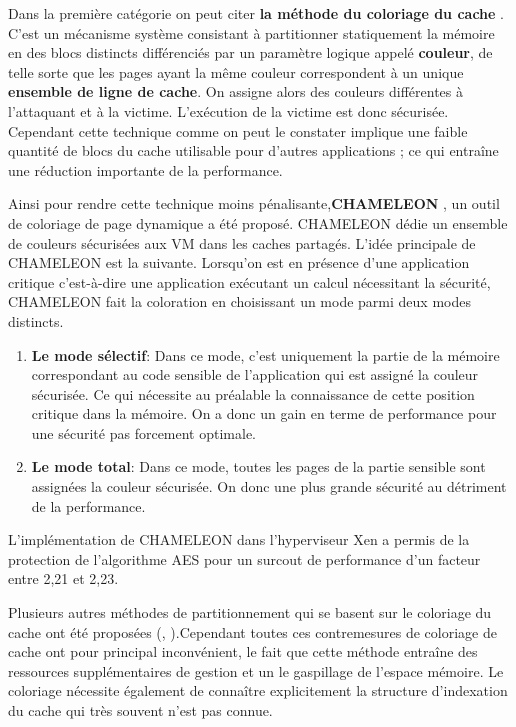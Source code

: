 Dans la première catégorie on peut citer \textbf {la méthode  du coloriage du cache} \cite{partitioning}. C'est un mécanisme système consistant à partitionner statiquement la mémoire en des blocs distincts différenciés par un paramètre logique  appelé \textbf{couleur}, de telle sorte que  les pages ayant la même couleur correspondent  à un unique \textbf{ensemble de ligne de cache}. On assigne alors des couleurs différentes à l’attaquant et à la victime. L’exécution de la victime est donc sécurisée. Cependant cette technique comme on peut le constater implique une faible quantité de blocs du cache utilisable pour d’autres applications ; ce qui entraîne une réduction importante de  la performance.\par 
Ainsi pour rendre cette technique moins pénalisante,\textbf{CHAMELEON} \cite{chameleon}, un outil de coloriage de page dynamique a été proposé. CHAMELEON dédie un ensemble de couleurs sécurisées aux VM dans les caches partagés. L’idée  principale de CHAMELEON est la suivante. Lorsqu’on est en présence d’une application critique c’est-à-dire une application exécutant un calcul nécessitant la sécurité,  CHAMELEON fait la coloration en choisissant un mode parmi deux modes distincts.
\begin{enumerate}
 \item \textbf{ Le mode sélectif}: Dans ce mode,  c’est uniquement la partie de la mémoire correspondant au code sensible de l’application qui est assigné la couleur sécurisée. Ce qui nécessite  au préalable la connaissance de cette position critique dans la mémoire. On a donc  un gain en terme de performance pour une sécurité pas forcement optimale.
 \item \textbf{ Le mode total}: Dans ce mode, toutes les pages de la partie sensible sont assignées la couleur sécurisée. On donc une plus grande sécurité au détriment de la performance.
\end{enumerate}
L’implémentation de CHAMELEON  dans l’hyperviseur Xen a permis de  la protection de l’algorithme AES pour un surcout de performance  d'un facteur entre 2,21 et 2,23. \par Plusieurs autres méthodes de partitionnement qui se basent sur le coloriage du cache  ont été proposées (\cite{Godefrey}, \cite{STEALTHMEM}).Cependant toutes ces contremesures de coloriage de cache ont pour principal inconvénient, le fait que cette méthode entraîne des ressources supplémentaires de gestion et un le gaspillage de l'espace  mémoire. Le coloriage nécessite également de connaître explicitement la structure  d'indexation du cache qui très souvent n’est pas connue. \newline{}

